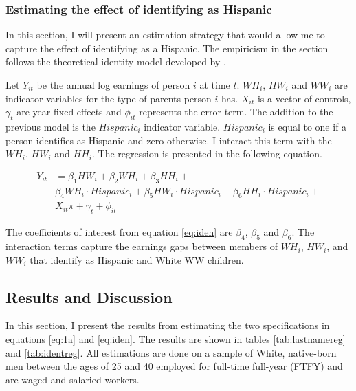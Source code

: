 \documentclass[12pt, fullpage]{article}
\begin{document}
\subsubsection{Estimating the effect of identifying as Hispanic}

In this section, I will present an estimation strategy that would allow me to capture the effect of identifying as a Hispanic. The empiricism in the section follows the theoretical identity model developed by \citet{akerlof2000economics}. 

Let $Y_{it}$ be the annual log earnings of person $i$ at time $t$. $WH_{i}$, $HW_{i}$ and $WW_{i}$ are indicator variables for the type of parents person $i$ has. $X_{it}$ is a vector of controls, $\gamma_{t}$ are year fixed effects and $\phi_{it}$ represents the error term. The addition to the previous model is the $Hispanic_{i}$ indicator variable. $Hispanic_{i}$ is equal to one if a person identifies as Hispanic and zero otherwise. I interact this term with the $WH_{i}$, $HW_{i}$ and $HH_{i}$.  The regression is presented in the following equation.

\begin{align} \label{eq:iden}
Y_{it} &= \beta_{1} HW_{i} +  \beta_{2} WH_{i} + \beta_{3} HH_{i} +\\
& \beta_{4} WH_{i} \cdot Hispanic_{i} + \beta_{5} HW_{i}\cdot Hispanic_{i} +  \beta_{6} HH_{i} \cdot Hispanic_{i}+ \nonumber \\
&X_{it} \pi + \gamma_{t}+\phi_{it} \nonumber
\end{align}

The coefficients of interest from equation \ref{eq:iden} are $\beta_{4}$, $\beta_{5}$ and $\beta_{6}$. The interaction terms capture the earnings gaps between members of $WH_{i}$, $HW_{i}$, and $WW_{i}$ that identify as Hispanic and White WW children. 


\subsection{Results and Discussion}\label{sec:results}

In this section, I present the results from estimating the two specifications in equations \ref{eq:1a} and \ref{eq:iden}. The results are shown in tables \ref{tab:lastnamereg} and \ref{tab:identreg}. All estimations are done on a sample of White, native-born men between the ages of 25 and 40 employed for full-time full-year (FTFY) and are waged and salaried workers.
\end{document}

